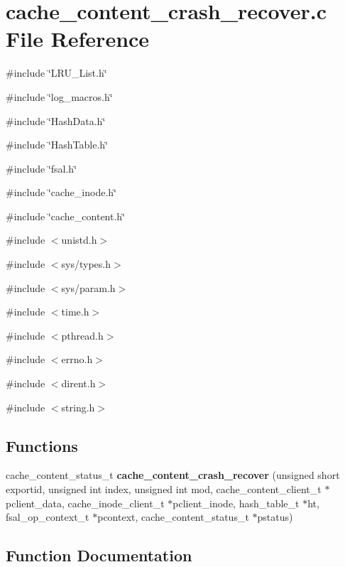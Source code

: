 \section{cache\_\-content\_\-crash\_\-recover.c File Reference}
\label{cache__content__crash__recover_8c}
{\ttfamily \#include \char`\"{}LRU\_\-List.h\char`\"{}}\par
{\ttfamily \#include \char`\"{}log\_\-macros.h\char`\"{}}\par
{\ttfamily \#include \char`\"{}HashData.h\char`\"{}}\par
{\ttfamily \#include \char`\"{}HashTable.h\char`\"{}}\par
{\ttfamily \#include \char`\"{}fsal.h\char`\"{}}\par
{\ttfamily \#include \char`\"{}cache\_\-inode.h\char`\"{}}\par
{\ttfamily \#include \char`\"{}cache\_\-content.h\char`\"{}}\par
{\ttfamily \#include $<$unistd.h$>$}\par
{\ttfamily \#include $<$sys/types.h$>$}\par
{\ttfamily \#include $<$sys/param.h$>$}\par
{\ttfamily \#include $<$time.h$>$}\par
{\ttfamily \#include $<$pthread.h$>$}\par
{\ttfamily \#include $<$errno.h$>$}\par
{\ttfamily \#include $<$dirent.h$>$}\par
{\ttfamily \#include $<$string.h$>$}\par
\subsection*{Functions}
\begin{DoxyCompactItemize}
\item 
cache\_\-content\_\-status\_\-t {\bf cache\_\-content\_\-crash\_\-recover} (unsigned short exportid, unsigned int index, unsigned int mod, cache\_\-content\_\-client\_\-t $\ast$pclient\_\-data, cache\_\-inode\_\-client\_\-t $\ast$pclient\_\-inode, hash\_\-table\_\-t $\ast$ht, fsal\_\-op\_\-context\_\-t $\ast$pcontext, cache\_\-content\_\-status\_\-t $\ast$pstatus)
\end{DoxyCompactItemize}


\subsection{Function Documentation}
